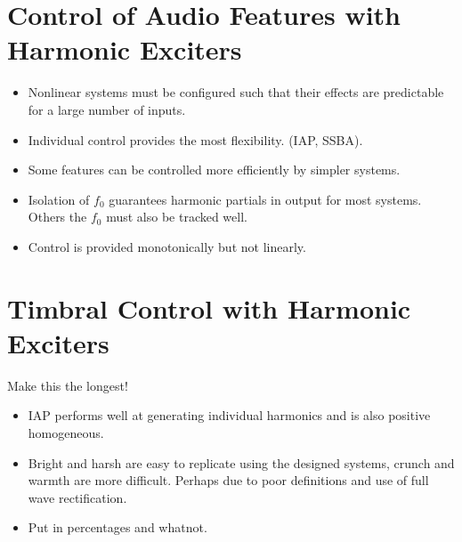 \section{Control of Audio Features with Harmonic Exciters}
\label{sec:Conclusion-FeatureConrol}
	\note
	{
		\begin{itemize}
			\item Nonlinear systems must be configured such that their effects are predictable for a large
				number of inputs.
			\item Individual control provides the most flexibility. (IAP, SSBA).
			\item Some features can be controlled more efficiently by simpler systems.
			\item Isolation of $f_{0}$ guarantees harmonic partials in output for most systems. Others the
				$f_{0}$ must also be tracked well.
			\item Control is provided monotonically but not linearly.
		\end{itemize}
	}

\section{Timbral Control with Harmonic Exciters}
\label{sec:Conclusion-TimbralControl}
	\note
	{
		Make this the longest!

		\begin{itemize}
			\item IAP performs well at generating individual harmonics and is also positive homogeneous.
			\item Bright and harsh are easy to replicate using the designed systems, crunch and warmth are more
				difficult. Perhaps due to poor definitions and use of full wave rectification.
			\item Put in percentages and whatnot.
		\end{itemize}
	}

